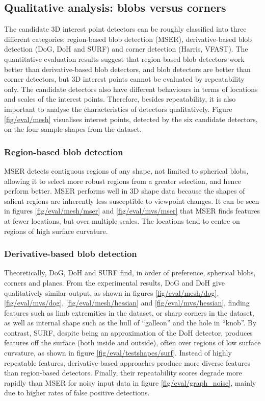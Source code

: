 \subsection{Qualitative analysis: blobs versus corners}
The candidate 3D interest point detectors can be roughly classified into three different categories: region-based blob detection (MSER), derivative-based blob detection (DoG, DoH and SURF) and corner detection (Harris, VFAST). The quantitative evaluation results suggest that region-based blob detectors work better than derivative-based blob detectors, and blob detectors are better than corner detectors, but 3D interest points cannot be evaluated by repeatability only. The candidate detectors also have different behaviours in terms of locations and scales of the interest points. Therefore, besides repeatability, it is also important to analyse the characteristics of detectors qualitatively. Figure \ref{fig/eval/mesh} visualises interest points, detected by the six candidate detectors, on the four sample shapes from the \meshset dataset.

\subsubsection{Region-based blob detection} MSER detects contiguous regions of any shape, \ie not limited to spherical blobs, allowing it to select more robust regions from a greater selection, and hence perform better. MSER performs well in 3D shape data because the shapes of salient regions are inherently less susceptible to viewpoint changes. It can be seen in figures \ref{fig/eval/mesh/mser} and \ref{fig/eval/mvs/mser} that MSER finds features at fewer locations, but over multiple scales. The locations tend to centre on regions of high surface curvature.

\subsubsection{Derivative-based blob detection} Theoretically, DoG, DoH and SURF find, in order of preference, spherical blobs, corners and planes. From the experimental results, DoG and DoH give qualitatively similar output, as shown in figures \ref{fig/eval/mesh/dog}, \ref{fig/eval/mvs/dog}, \ref{fig/eval/mesh/hessian} and \ref{fig/eval/mvs/hessian}, finding features such as limb extremities in the \meshset dataset, or sharp corners in the \stereoset dataset, as well as internal shape such as the hull of ``galleon'' and the hole in ``knob''. By contrast, SURF, despite being an approximation of the DoH detector, produces features off the surface (both inside and outside), often over regions of low surface curvature, as shown in figure \ref{fig/eval/testshapes/surf}. Instead of highly repeatable features, derivative-based approaches produce more diverse features than region-based detectors. Finally, their repeatability scores degrade more rapidly than MSER for noisy input data in figure \ref{fig/eval/graph_noise}, mainly due to higher rates of false positive detections. 


